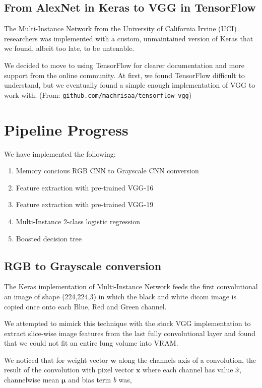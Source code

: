 \documentclass[twocolumn,10pt]{article}
\renewcommand{\b}{\boldsymbol}
\begin{document}
\subsection{From AlexNet in Keras to VGG in TensorFlow}

The Multi-Instance Network from the University of
California Irvine (UCI) researchers was implemented with a custom, unmaintained
version of Keras that we found, albeit too late, to be untenable. 

We decided to move to using TensorFlow for clearer documentation and more support
from the online community. At first, we found TensorFlow difficult to understand,
but we eventually found a simple enough implementation of VGG to work with.
(From: \texttt{github.com/machrisaa/tensorflow-vgg})

\section{Pipeline Progress}
We have implemented the following:
\begin{enumerate}[noitemsep]
  \item Memory concious RGB CNN to Grayscale CNN conversion
  \item Feature extraction with pre-trained VGG-16
  \item Feature extraction with pre-trained VGG-19
  \item Multi-Instance 2-class logistic regression
  \item Boosted decision tree
\end{enumerate}

\subsection{RGB to Grayscale conversion}
The Keras implementation of Multi-Instance Network feeds the first convolutional
an image of shape (224,224,3) in which the black and white dicom image is
copied once onto each Blue, Red and Green channel.

We attempted to mimick this technique with the stock VGG implementation to extract
slice-wise image features from the last fully convolutional layer and found that
we could not fit an entire lung volume into VRAM.

We noticed that for weight vector $\b w$ along the channels axis of a convolution, the
result of the convolution with pixel vector $\b x$ where each channel has value
$\hat x$, channelwise mean $\b \mu$ and bias
term $b$ was,
\end{document}
